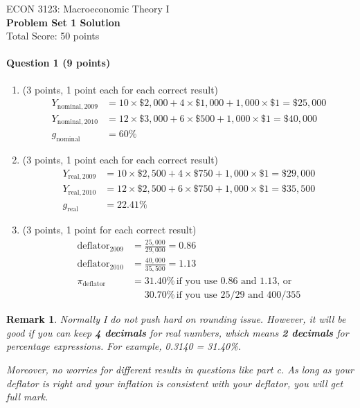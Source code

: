 \documentclass[12pt]{article}
\newtheorem*{remark}{Remark}
\begin{document}
\begin{center}
    ECON 3123: Macroeconomic Theory I\\
    {\large \textbf{Problem Set 1 Solution}}\\
    Total Score: 50 points
\end{center}

\paragraph{Question 1 (9 points)}
\begin{enumerate}[label=\alph*.]
	\item (3 points, 1 point each for each correct result)
	\begin{align*}
	    Y_{\text{nominal}, 2009} &= 10 \times \$2,000 + 4 \times \$1,000 + 1,000 \times \$1 = \$25,000\\
		Y_{\text{nominal}, 2010} &= 12 \times \$3,000 + 6 \times \$500 + 1,000 \times \$1 = \$40,000\\
		g_{\text{nominal}} &= 60\%
	\end{align*}
	\item (3 points, 1 point each for each correct result)
	\begin{align*}
	    Y_{\text{real}, 2009} &= 10 \times \$2,500 + 4 \times \$750 + 1,000 \times \$1 = \$29,000\\
		Y_{\text{real}, 2010} &= 12 \times \$2,500 + 6 \times \$750 + 1,000 \times \$1 = \$35,500\\
		g_{\text{real}} &= 22.41\%
	\end{align*}
	\item (3 points, 1 point for each correct result)
	\begin{align*}
	    \text{deflator}_{2009} &= \frac{25,000}{29,000} = 0.86\\
		\text{deflator}_{2010} &= \frac{40,000}{35,500} = 1.13\\
		\pi_{\text{deflator}} &= 31.40\% \,\text{if you use 0.86 and 1.13, or }\\
		&\,\,\,\,\,\,\,\,30.70\%\, \text{if you use 25/29 and 400/355}
	\end{align*}
\end{enumerate}

\begin{remark}
	Normally I do not push hard on rounding issue. However, it will be good if you can keep \textbf{4 decimals} for real numbers, which means \textbf{2 decimals} for percentage expressions. For example, 0.3140 = 31.40\%.

	Moreover, no worries for different results in questions like part c. As long as your deflator is right and your inflation is consistent with your deflator, you will get full mark.
\end{remark}
\end{document}
